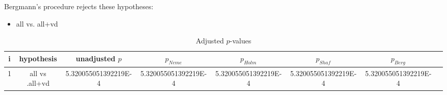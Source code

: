 \documentclass[a4paper,10pt]{article}
\begin{document}
\begin{landscape}
Bergmann's procedure rejects these hypotheses:


\begin{itemize}


\item all vs. all+vd
\end{itemize}


\begin{table}[!htp]
\centering\tiny
\caption{Adjusted $p$-values}
\begin{tabular}{cccccccc}
i&hypothesis&unadjusted $p$&$p_{Neme}$&$p_{Holm}$&$p_{Shaf}$&$p_{Berg}$\\
\hline
1&all vs .all+vd&5.320055051392219E-4&5.320055051392219E-4&5.320055051392219E-4&5.320055051392219E-4&5.320055051392219E-4\\\hline
\end{tabular}
\end{table}

\end{landscape}
\end{document}
